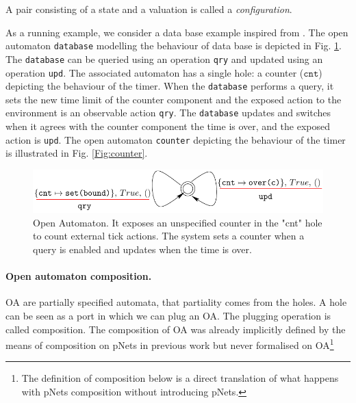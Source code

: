 \documentclass[runningheads]{llncs}
\begin{document}
A pair consisting of a state and a valuation is called a \emph{configuration}.
%

\begin{example} As a running example, we consider a data base example inspired from \cite{Gorrieri:2001}. The open automaton \texttt{database}  modelling the behaviour of data base is depicted in Fig. \ref{Fig:SpecOA}. The \texttt{database} can be queried using an operation \texttt{qry} and updated using an operation \texttt{upd}. The associated automaton has a single hole:  a counter ($\texttt{cnt}$)  depicting  the behaviour of the timer. When the \texttt{database}  performs a query,  it sets the new time limit of the counter component and the exposed action to the environment is an observable  action \texttt{qry}.
The \texttt{database} updates and  switches when it agrees with the counter component the time is over, and the exposed action is \texttt{upd}.
The open automaton \texttt{counter}    depicting  the behaviour of the timer is illustrated in Fig. \ref{Fig:counter}. 
\end{example}
\begin{figure}[h]
 \centering
   \includegraphics[width=.9\textwidth]{Figures/database.pdf}
   \caption{Open Automaton. It exposes an unspecified counter in the "cnt" hole
 to count external tick actions. The system sets a counter when a query is enabled and updates  when  the time is over.\label{Fig:SpecOA}}
\end{figure}





\paragraph{Open automaton composition.}

OA are partially specified automata, that partiality comes  from the holes.
A hole can be seen as a port in which we can plug an OA.
The plugging operation is called composition.
The composition of OA was already implicitly defined by the means of composition on pNets in previous work \cite{henrio:01299562} but never  formalised on OA\footnote{The definition of composition below is a direct translation of what happens with pNets composition \cite{henrio:01299562} without  introducing pNets.}
\end{document}
